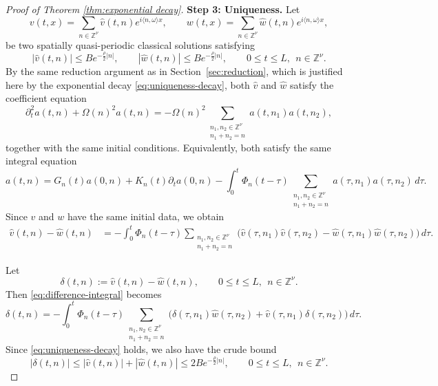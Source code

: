 \documentclass[10pt,a4paper]{amsart}
\begin{document}
\begin{proof}[Proof of Theorem \ref{thm:exponential decay}]
\medskip
\noindent
\textbf{Step 3: Uniqueness.}
Let
\[
v(t,x)=\sum_{n\in \mathbb{Z}^{\nu}} \widehat v(t,n)e^{i\langle n,\omega\rangle x},
\qquad
w(t,x)=\sum_{n\in \mathbb{Z}^{\nu}} \widehat w(t,n)e^{i\langle n,\omega\rangle x},
\]
be two spatially quasi-periodic classical solutions satisfying
\begin{equation}\label{eq:uniqueness-decay}
|\widehat v(t,n)|\leq B e^{-\frac{\rho}{2}|n|},
\qquad
|\widehat w(t,n)|\leq B e^{-\frac{\rho}{2}|n|},
\qquad
0\leq t\leq L,\ \ n\in \mathbb{Z}^{\nu}.
\end{equation}
By the same reduction argument as in Section~\ref{sec:reduction}, which is justified
here by the exponential decay \eqref{eq:uniqueness-decay}, both $\widehat v$ and
$\widehat w$ satisfy the coefficient equation
\[
\partial_t^2 a(t,n)+\Omega(n)^2 a(t,n)
=
-\Omega(n)^2
\sum_{\substack{n_1,n_2\in \mathbb{Z}^{\nu}\\ n_1+n_2=n}}
a(t,n_1)a(t,n_2),
\]
together with the same initial conditions. Equivalently, both satisfy the same integral
equation
\[
a(t,n)
=
G_n(t)a(0,n)+K_n(t)\partial_t a(0,n)
-
\int_0^t \Phi_n(t-\tau)
\sum_{\substack{n_1,n_2\in \mathbb{Z}^{\nu}\\ n_1+n_2=n}}
a(\tau,n_1)a(\tau,n_2)\,d\tau .
\]
Since $v$ and $w$ have the same initial data, we obtain
\begin{align}
\widehat v(t,n)-\widehat w(t,n)
&=
-\int_0^t \Phi_n(t-\tau)
\sum_{\substack{n_1,n_2\in \mathbb{Z}^{\nu}\\ n_1+n_2=n}}
\Big(
\widehat v(\tau,n_1)\widehat v(\tau,n_2)
-
\widehat w(\tau,n_1)\widehat w(\tau,n_2)
\Big)\,d\tau .
\label{eq:difference-integral}
\end{align}

Let
\[
\delta(t,n):=\widehat v(t,n)-\widehat w(t,n),
\qquad
0\leq t\leq L,\ \ n\in \mathbb{Z}^{\nu}.
\]
Then \eqref{eq:difference-integral} becomes
\begin{equation}\label{eq:difference-integral-delta}
\delta(t,n)
=
-\int_0^t \Phi_n(t-\tau)
\sum_{\substack{n_1,n_2\in \mathbb{Z}^{\nu}\\ n_1+n_2=n}}
\Big(
\delta(\tau,n_1)\widehat w(\tau,n_2)
+
\widehat v(\tau,n_1)\delta(\tau,n_2)
\Big)\,d\tau .
\end{equation}
Since \eqref{eq:uniqueness-decay} holds, we also have the crude bound
\begin{equation}\label{eq:delta-crude}
|\delta(t,n)|
\leq
|\widehat v(t,n)|+|\widehat w(t,n)|
\leq
2B e^{-\frac{\rho}{2}|n|},
\qquad
0\leq t\leq L,\ \ n\in \mathbb{Z}^{\nu}.
\end{equation}


\end{proof}
\end{document}
